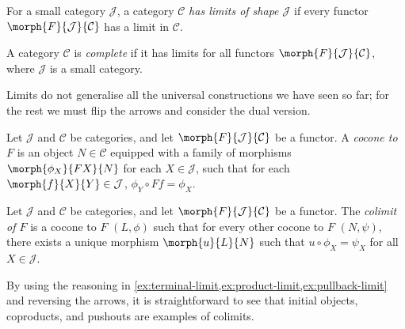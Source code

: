 \begin{definition}
    For a small category \(\mathcal{J}\), a category \(\mathcal{C}\)
    \emph{has limits of shape \(\mathcal{J}\)} if every functor
    \(\morph{F}{\mathcal{J}}{\mathcal{C}}\) has a limit in \(\mathcal{C}\).
\end{definition}

\begin{definition}
    A category \(\mathcal{C}\) is \emph{complete} if it has limits for all
    functors \(\morph{F}{\mathcal{J}}{\mathcal{C}}\), where \(\mathcal{J}\) is a
    small category.
\end{definition}

Limits do not generalise all the universal constructions we have seen so far;
for the rest we must flip the arrows and consider the dual version.

\begin{definition}[Cocone]
    Let \(\mathcal{J}\) and \(\mathcal{C}\) be categories, and let
    \(\morph{F}{\mathcal{J}}{\mathcal{C}}\) be a functor.
    A \emph{cocone to \(F\)} is an object \(N \in \mathcal{C}\) equipped with
    a family of morphisms \(\morph{\phi_X}{FX}{N}\) for each
    \(X \in \mathcal{J}\), such that for each
    \(\morph{f}{X}{Y} \in \mathcal{J}\),
    \(\phi_Y \circ Ff = \phi_X\).
    \begin{center}
        
    \end{center}
\end{definition}

\begin{definition}[Limit]
    Let \(\mathcal{J}\) and \(\mathcal{C}\) be categories, and let
    \(\morph{F}{\mathcal{J}}{\mathcal{C}}\) be a functor.
    The \emph{colimit of \(F\)} is a cocone to \(F\) \((L,\phi)\) such that for
    every other cocone to \(F\) \((N, \psi)\), there exists a unique morphism
    \(\morph{u}{L}{N}\) such that \(u \circ \phi_X = \psi_X\) for all
    \(X \in \mathcal{J}\).
    \begin{center}
        
    \end{center}
\end{definition}

\begin{example}
    By using the reasoning in
    \cref{ex:terminal-limit,ex:product-limit,ex:pullback-limit} and reversing
    the arrows, it is straightforward to see that initial objects, coproducts,
    and pushouts are examples of colimits.
\end{example}

